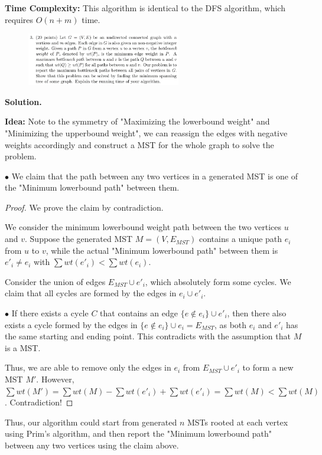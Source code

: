 \documentclass[10pt]{article}
\begin{document}
\textbf{Time Complexity:} This algorithm is identical to the DFS algorithm, which requires $O(n+m)$ time.

\newpage

\begin{figure}[h]
	\centering
	\includegraphics[width=0.6\textwidth]{hw4-3}
\end{figure}

\textbf{Solution.}

\textbf{Idea:} Note to the symmetry of "Maximizing the lowerbound weight" and "Minimizing the upperbound weight", we can reassign the edges with negative weights accordingly and construct a MST for the whole graph to solve the problem.

$\bullet$ We claim that the path between any two vertices in a generated MST is one of the "Minimum lowerbound path" between them.

\begin{proof}
	We prove the claim by contradiction.
	
	We consider the minimum lowerbound weight path between the two vertices $u$ and $v$. Suppose the generated MST $M = (V, E_{MST})$ contains a unique path ${e_i}$ from $u$ to $v$, while the actual "Minimum lowerbound path" between them is ${e'_i} \neq {e_i}$ with $\sum wt(e'_i) < \sum wt(e_i)$.

	Consider the union of edges $E_{MST} \cup {e'_i}$, which absolutely form some cycles. We claim that all cycles are formed by the edges in ${e_i} \cup {e'_i}$.

	$\bullet$ If there exists a cycle $C$ that contains an edge $\{e \notin {e_i}\} \cup {e'_i}$, then there also exists a cycle formed by the edges in $\{e \notin {e_i}\} \cup {e_i} = E_{MST}$, as both ${e_i}$ and ${e'_i}$ has the same starting and ending point. This contradicts with the assumption that $M$ is a MST.

	Thus, we are able to remove only the edges in ${e_i}$ from $E_{MST} \cup {e'_i}$ to form a new MST $M'$. However, $\sum wt(M') = \sum wt(M) - \sum wt({e'_i}) + \sum wt({e'_i}) = \sum wt(M) < \sum wt(M)$. Contradiction!
\end{proof}

Thus, our algorithm could start from generated $n$ MSTs rooted at each vertex using Prim's algorithm, and then report the "Minimum lowerbound path" between any two vertices using the claim above.
\end{document}
